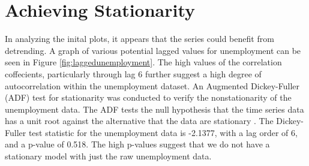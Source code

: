 \documentclass[twoside,twocolumn]{article}
\begin{document}

\section{Achieving Stationarity}

In analyzing the inital plots, it appears that the series could benefit from detrending. A graph of various potential lagged values for unemployment can be seen in Figure \ref{fig:laggedunemployment}. The high values of the correlation coffecients, particularly through lag 6 further suggest a high degree of autocorrelation within the unemployment dataset.    An Augmented Dickey-Fuller (ADF) test for stationarity was conducted to verify the nonstationarity of the unemployment data.  The ADF tests the null hypothesis that the time series data has a unit root against the alternative that the data are stationary \citep{Shumway2006}. The Dickey-Fuller test statistic for the unemployment data is -2.1377, with a lag order of 6, and a p-value of 0.518. The high p-values suggest that we do not have a stationary model with just the raw unemployment data.
			
\end{document}
